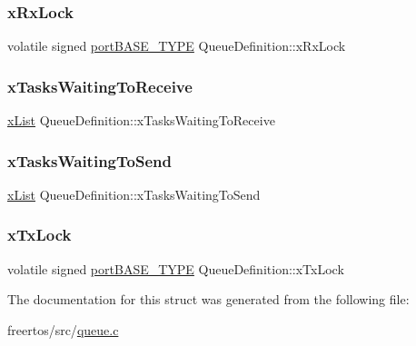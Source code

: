 \mbox{\label{struct_queue_definition_a55d7241c91d75f3bf4ad4032aeaaf824}} 
\subsubsection{\texorpdfstring{x\+Rx\+Lock}{xRxLock}}
{\footnotesize\ttfamily volatile signed \mbox{\hyperlink{portmacro_8h_a1ebe82d24d764ae4e352f7c3a9f92c01}{port\+B\+A\+S\+E\+\_\+\+T\+Y\+PE}} Queue\+Definition\+::x\+Rx\+Lock}

\mbox{\label{struct_queue_definition_a3f26a41f0c0d17fc4645905b309b33aa}} 
\subsubsection{\texorpdfstring{x\+Tasks\+Waiting\+To\+Receive}{xTasksWaitingToReceive}}
{\footnotesize\ttfamily \mbox{\hyperlink{list_8h_a3cee7d8d40380f66ac73b8825b5a0fb0}{x\+List}} Queue\+Definition\+::x\+Tasks\+Waiting\+To\+Receive}

\mbox{\label{struct_queue_definition_a073ad0a31a51508395efd54599c73ee1}} 
\subsubsection{\texorpdfstring{x\+Tasks\+Waiting\+To\+Send}{xTasksWaitingToSend}}
{\footnotesize\ttfamily \mbox{\hyperlink{list_8h_a3cee7d8d40380f66ac73b8825b5a0fb0}{x\+List}} Queue\+Definition\+::x\+Tasks\+Waiting\+To\+Send}

\mbox{\label{struct_queue_definition_a393aeeb16596b1be505014b57158c995}} 
\subsubsection{\texorpdfstring{x\+Tx\+Lock}{xTxLock}}
{\footnotesize\ttfamily volatile signed \mbox{\hyperlink{portmacro_8h_a1ebe82d24d764ae4e352f7c3a9f92c01}{port\+B\+A\+S\+E\+\_\+\+T\+Y\+PE}} Queue\+Definition\+::x\+Tx\+Lock}



The documentation for this struct was generated from the following file\+:\begin{DoxyCompactItemize}
\item 
freertos/src/\mbox{\hyperlink{queue_8c}{queue.\+c}}\end{DoxyCompactItemize}
